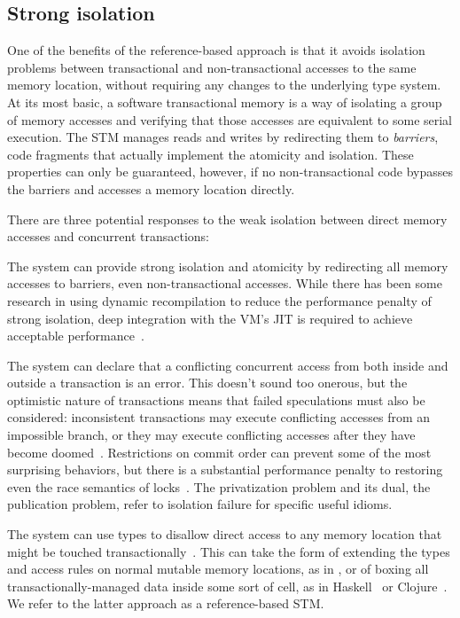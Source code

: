 \subsection*{Strong isolation}

One of the benefits of the reference-based approach is that it avoids
isolation problems between transactional and non-transactional accesses to
the same memory location, without requiring any changes to the underlying
type system.
At its most basic, a software transactional memory is a way of isolating
a group of memory accesses and verifying that those accesses are
equivalent to some serial execution.  The STM manages reads and writes
by redirecting them to \textit{barriers}, code fragments that actually
implement the atomicity and isolation.  These properties can only be
guaranteed, however, if no non-transactional code bypasses the barriers
and accesses a memory location directly.

There are three potential responses to the weak isolation between direct memory
accesses and concurrent transactions:
\begin{packed_itemize}

\item The system can provide strong isolation and atomicity by redirecting
all memory accesses to barriers, even non-transactional accesses.  While
there has been some research in using dynamic recompilation to reduce the
performance penalty of strong isolation, deep integration with the VM's
JIT is required to achieve acceptable performance~\cite{inteldbo,mydbo}.

\item The system can declare that a conflicting concurrent access
from both inside and outside a transaction is an error.  This doesn't
sound too onerous, but the optimistic nature of transactions means
that failed speculations must also be considered: inconsistent
transactions may execute conflicting accesses from an impossible
branch, or they may execute conflicting accesses after they have become
doomed~\cite{grossman?get-cite-from-my-dbo}.  Restrictions on commit
order can prevent some of the most surprising behaviors, but there is
a substantial performance penalty to restoring even the race semantics
of locks~\cite{sgla}.  The privatization problem and its dual, the
publication problem, refer to isolation failure for specific useful
idioms.

\item The system can use types to disallow direct access to any memory
location that might be touched transactionally~\cite{smallstepsemantics}.
This can take the form of extending the types and access rules on
normal mutable memory locations, as in , or
of boxing all transactionally-managed data inside some sort of cell,
as in Haskell~\cite{cmt} or Clojure~\cite{?}.  We refer to the latter
approach as a reference-based STM.

\end{packed_itemize}


